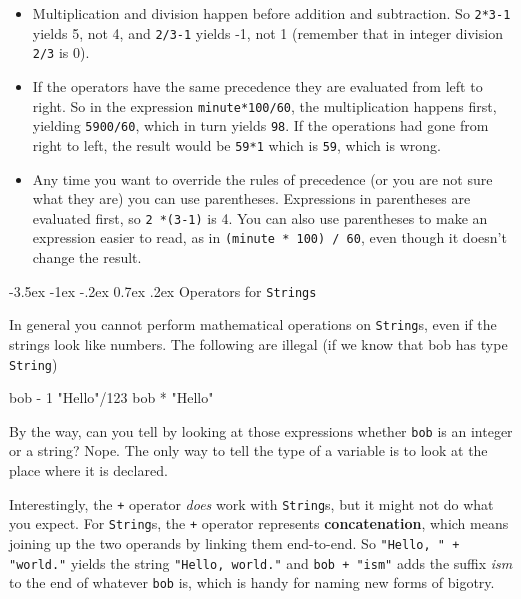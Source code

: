 \documentclass{book}
\makeatletter
\renewcommand{\section}{\@startsection 
    {section} {1} {0mm}%
    {-3.5ex \@plus -1ex \@minus -.2ex}%
    {0.7ex \@plus.2ex}%
    {\normalfont\Large\bfseries}}
\makeatother
\begin{document}
\begin{itemize}

\item Multiplication and division happen before
addition and subtraction.  So {\tt 2*3-1} yields 5, not 4, and
{\tt 2/3-1} yields -1, not 1 (remember that in integer division
{\tt 2/3} is 0).

\item If the operators have the same precedence they are evaluated
from left to right.  So in the expression {\tt minute*100/60},
the multiplication happens first, yielding {\tt 5900/60}, which
in turn yields {\tt 98}.  If the operations had gone from right
to left, the result would be {\tt 59*1} which is {\tt 59}, which
is wrong.

\item Any time you want to override the rules of precedence (or
you are not sure what they are) you can use parentheses.  Expressions
in parentheses are evaluated first, so {\tt 2 *(3-1)} is 4.
You can also use parentheses to make an expression easier to
read, as in {\tt(minute * 100) / 60}, even though it doesn't
change the result.

\end{itemize}


\section{Operators for {\tt Strings}}

In general you cannot perform mathematical operations on {\tt String}s,
even if the strings look like numbers.  The following are
illegal (if we know that bob has type {\tt String})

\begin{verbatimtab}
bob - 1         "Hello"/123      bob * "Hello"
\end{verbatimtab}
%
By the way, can you tell by looking at those expressions
whether {\tt bob} is an integer or a string?  Nope.
The only way to tell the type of a variable is to look at
the place where it is declared.


Interestingly, the {\tt +} operator {\em does} work with
{\tt String}s, but it might not do what you expect.
For {\tt String}s, the {\tt +} operator represents {\bf concatenation},
which means joining up the two operands by linking them
end-to-end.  So {\tt "Hello, " + "world."} yields the string
{\tt "Hello, world."} and {\tt bob + "ism"} adds the suffix
{\em ism} to the end of whatever {\tt bob} is, which is
handy for naming new forms of bigotry.
\end{document}
